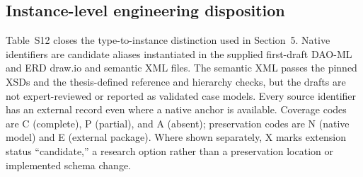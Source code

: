 \documentclass[10pt]{article}
\begin{document}
\clearpage
\begin{landscape}
\section*{Instance-level engineering disposition}
Table~S12 closes the type-to-instance distinction used in Section~5. Native
identifiers are candidate aliases instantiated in the supplied first-draft
DAO-ML and ERD draw.io and semantic XML files. The semantic XML passes the
pinned XSDs and the thesis-defined reference and hierarchy checks, but the
drafts are not expert-reviewed or reported as validated case models. Every source identifier has an external record even where a
native anchor is available. Coverage codes are C (complete), P (partial), and A
(absent); preservation codes are N (native model) and E (external package).
Where shown separately, X marks extension status ``candidate,'' a research
option rather than a preservation location or implemented schema change.


\end{landscape}
\end{document}
